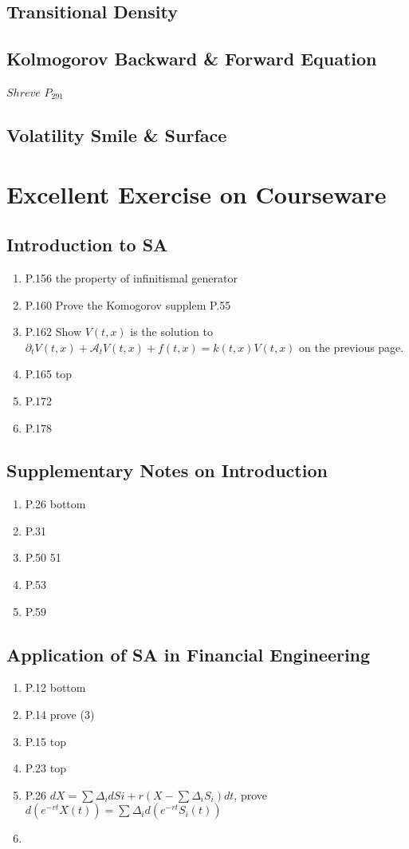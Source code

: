 \documentclass[a4paper, 12pt]{article}
\begin{document}
\subsection{Transitional Density}

\subsection{Kolmogorov Backward \& Forward Equation}
$Shreve$ $P_{291}$

\subsection{Volatility Smile \& Surface}

\section{Excellent Exercise on Courseware}
\subsection{Introduction to SA}
\begin{enumerate}

	\item P.156 the property of infinitismal generator
	\item P.160 Prove the Komogorov  supplem P.55
	\item P.162 Show $V(t, x)$ is the solution to $\partial_t V(t, x) + \mathcal{A}_t V(t, x) + f(t, x) = k(t, x)V(t,x)$ on the previous page.
	\item P.165 top
	\item P.172
	\item P.178
\end{enumerate}

\subsection{Supplementary Notes on Introduction}
\begin{enumerate}
	\item P.26 bottom
	\item P.31
	\item P.50 51
	\item P.53
	\item P.59
\end{enumerate}

\subsection{Application of SA in Financial Engineering}
\begin{enumerate}
	\item P.12 bottom
	\item P.14 prove (3)
	\item P.15 top
	\item P.23 top
	\item P.26 $dX = \sum \Delta_i dSi + r(X - \sum \Delta_i S_i)dt$, prove $d(e^{-rt} X(t)) = \sum \Delta_i d(e^{-rt} S_i(t))$
	\item 
\end{enumerate}
\end{document}
